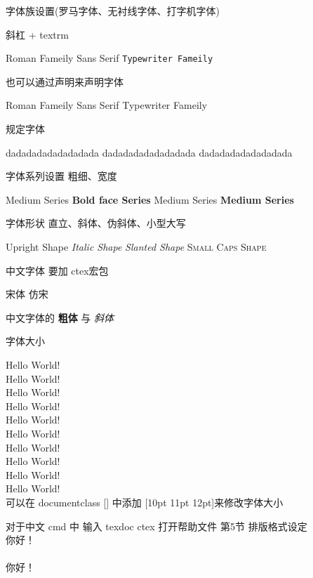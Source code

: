 \documentclass[UTF8]{ctexart}
\date{\today}
\begin{document}
	字体族设置(罗马字体、无衬线字体、打字机字体)
	
	斜杠 + textrm   
	
	\textrm{Roman Fameily}
	\textsf{Sans Serif}
	\texttt{Typewriter Fameily}	
	
	也可以通过声明来声明字体
	
	{\rmfamily Roman Fameily}
	{\sffamily Sans Serif}
	{\ttfamily Typewriter Fameily}
	
	规定字体
	
	{\rmfamily
		dadadadadadadadada
	}	
	{\sffamily
		dadadadadadadadada
	}
	{\ttfamily
		dadadadadadadadada
	}

	字体系列设置 粗细、宽度
	
	\textmd{Medium Series}
	\textbf{Bold face Series}
	{\mdseries Medium Series}
	{\bfseries Medium Series}
	
	字体形状  直立、斜体、伪斜体、小型大写
	
	\textup{Upright Shape}
	\textit{Italic Shape}
	\textsl{Slanted Shape}
	\textsc{Small Caps Shape}
	
	中文字体      要加 ctex宏包
	
	{\songti 宋体} \quad
	{\fangsong 仿宋} 
	
	中文字体的 \textbf{粗体} 与 \textit{斜体}
	
	字体大小
	
	{\tiny Hello World!}\\
	{\scriptsize Hello World!}\\
	{\footnotesize Hello World!}\\
	{\small Hello World!}\\
	{\normalsize Hello World!}\\
	{\large Hello World!}\\
	{\Large Hello World!}\\
	{\LARGE Hello World!}\\
	{\huge Hello World!}\\
	{\Huge Hello World!}\\
	
	可以在 documentclass [] 中添加 [10pt 11pt 12pt]来修改字体大小 
	
	对于中文 cmd 中 输入 texdoc ctex 打开帮助文件  第5节 排版格式设定
	\\
	 你好！\\
	\\   你好！
	
\end{document}
